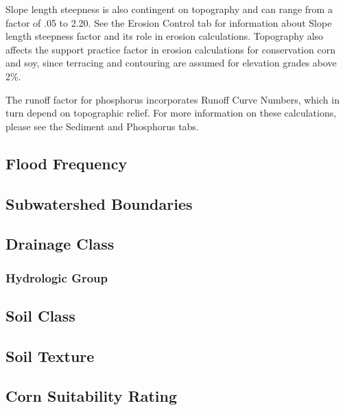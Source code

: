 \documentclass[11pt]{article}
\begin{document}
Slope length steepness is also contingent on topography and can range from a factor of .05 to 2.20. See the Erosion Control tab for information about Slope length steepness factor and its role in erosion calculations. Topography also affects the support practice factor in erosion calculations for conservation corn and soy, since terracing and contouring are assumed for elevation grades above 2\%. \cite{24}

The runoff factor for phosphorus incorporates Runoff Curve Numbers, which in turn depend on topographic relief. For more information on these calculations, please see the Sediment and Phosphorus tabs.

\subsection{Flood Frequency}

\subsection{Subwatershed Boundaries}

\subsection{Drainage Class}

\subsubsection{Hydrologic Group}

\subsection{Soil Class}

\subsection{Soil Texture}

\subsection{Corn Suitability Rating}


\newpage
\end{document}
